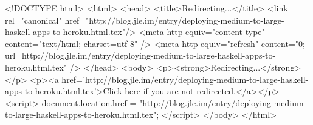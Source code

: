 <!DOCTYPE html>
<html>
<head>
<title>Redirecting...</title>
<link rel="canonical" href="http://blog.jle.im/entry/deploying-medium-to-large-haskell-apps-to-heroku.html.tex"/>
<meta http-equiv="content-type" content="text/html; charset=utf-8" />
<meta http-equiv="refresh" content="0; url=http://blog.jle.im/entry/deploying-medium-to-large-haskell-apps-to-heroku.html.tex" />
</head>
<body>
  <p><strong>Redirecting...</strong></p>
  <p><a href='http://blog.jle.im/entry/deploying-medium-to-large-haskell-apps-to-heroku.html.tex'>Click here if you are not redirected.</a></p>
  <script>
    document.location.href = "http://blog.jle.im/entry/deploying-medium-to-large-haskell-apps-to-heroku.html.tex";
  </script>
</body>
</html>
